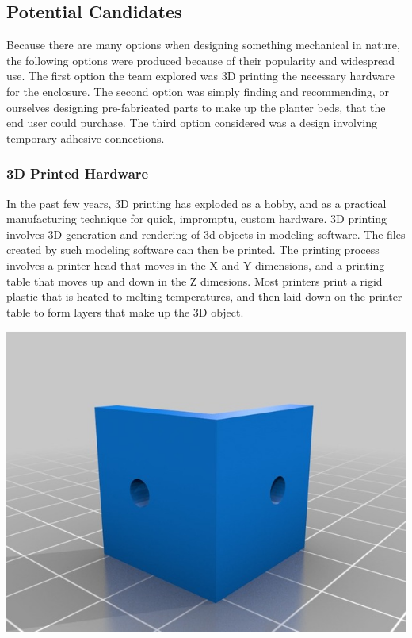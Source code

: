 	\subsection{Potential Candidates}
	Because there are many options when designing something mechanical in nature, the following options were produced because of their popularity and widespread use.  The
	first option the team explored was 3D printing the necessary hardware for the enclosure.  The second option was simply finding and recommending, or ourselves designing
	pre-fabricated parts to make up the planter beds, that the end user could purchase.  The third option considered was a design involving temporary adhesive connections.

	\subsubsection{3D Printed Hardware}
	In the past few years, 3D printing has exploded as a hobby, and as a practical manufacturing technique for quick, impromptu, custom hardware.  3D printing involves 3D
	generation and rendering of 3d objects in modeling software.  The files created by such modeling software can then be printed.  The printing process involves a printer
	head that moves in the X and Y dimensions, and a printing table that moves up and down in the Z dimesions.  Most printers print a rigid plastic that is heated to
	melting temperatures, and then laid down on the printer table to form layers that make up the 3D object.

	\begin{center}
		\includegraphics[scale=0.5]{90-degree-bracket.jpg}
	\end{center} \cite{IMG3}

